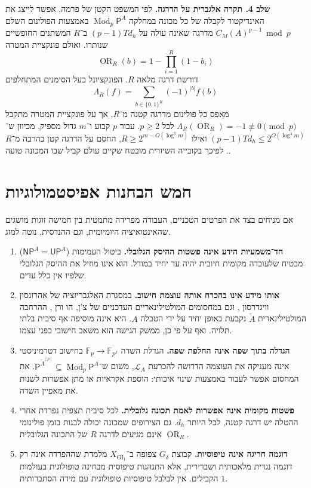 \documentclass[11pt,a4paper]{article}
\newcommand{\NP}{\mathsf{NP}}
\newcommand{\UP}{\mathsf{UP}}
\newcommand{\PP}{\mathsf P}
\newcommand{\GI}{\mathrm{GI}_1}
\newcommand{\FF}{\mathbb F}
\newcommand{\LA}{\mathcal{L}_A}
\newcommand{\MOD}{\operatorname{Mod}}
\newcommand{\OR}{\operatorname{OR}}
\begin{document}
\medskip
\noindent\textbf{שלב 4. תקרה אלגברית על הדרגה.}
לפי המשפט הקטן של פרמה, אפשר לייצג את האינדיקטור לקבלה של כל מכונה במחלקה $\MOD_p\PP^A$ באמצעות הפולינום השלם $C_M(A)^{p-1}\bmod p$ מדרגה שאינה עולה על $(p-1)T d_h$ ב־$R$ המשתנים החופשיים שנותרו. ואולם פונקציית המטרה
\[
\OR_R(b)=1-\prod_{i=1}^R(1-b_i)
\]
דורשת דרגה מלאה $R$. הפונקציונל בעל הסימנים המתחלפים
\[
\Lambda_R(f)=\sum_{b\in\{0,1\}^R}(-1)^{|b|}f(b)
\]
מאפס כל פולינום מדרגה קטנה מ־$R$, אך על פונקציית המטרה מתקבל $\Lambda_R(\OR_R)=-1\not\equiv0\pmod p$ לכל $p\ge2$. עבור $p$ קבוע ו־$m$ גדול מספיק, מכיוון ש־$(p-1)T d_h\le2^{O(\log^4m)}$ ואילו $R\ge2^{m-O(\log^5m)}$, החסם על הדרגה קטן בהרבה מ־$R$. לפיכך בקובייה השיורית מובטח שקיים עולם קביל שבו המכונה טועה.

\section{חמש הבחנות אפיסטמולוגיות}
אם מניחים בצד את הפרטים הטכניים, העבודה מפרידה מתמטית בין חמישה זוגות מושגים שהאינטואיציה היומיומית, וגם ההנדסית, נוטה למזג.

\begin{enumerate}
\item \textbf{חד־משמעיות הידע אינה פשטות ההיסק הגלובלי.} ביטול העמימות ($\NP^A=\UP^A$) מבטיח שלעובדה מקומית חיובית יהיה עד יחיד במודל. הוא אינו מוזיל את ההיסק הגלובלי שלפיו אין כלל עדים.
\item \textbf{אותו מידע אינו בהכרח אותה עוצמת חישוב.} במסגרת האלגבריזציה של אהרונסון וויגדרסון \cite{aw}, וגם במחסומים המולטילינאריים העדכניים של צ'ן, הו ורן \cite{chr}, ההרחבה המולטילינארית $\widetilde A$ נקבעת באופן יחיד על ידי הטבלה $A$. היא אינה מוסיפה אף סיבית בלתי תלויה. ואף על פי כן, ממשק הגישה הוא משאב חישובי בפני עצמו.
\item \textbf{הגדלה בתוך שפה אינה החלפת שפה.} הגדלת השדה $\FF_p\to\FF_{p^k}$ בחישוב דטרמיניסטי אינה מעניקה את העוצמה הדרושה להכרעת $\LA$, משום ש־$\PP^{\widetilde A^{[p]}}\subseteq\MOD_p\PP^A$. את המחסום אפשר לעבור באמצעות שינוי איכותי: הוספת אקראיות או מתן אפשרות לשנות את מאפיין השדה.
\item \textbf{פשטות מקומית אינה אפשרות לאמת תכונה גלובלית.} לכל סיבית תצפית נפרדת אחרי ההטלה יש דרגה קטנה, לכל היותר $d_h$. גם הצירופים שמכונה יכולה לבנות בזמן פולינומי אינם מגיעים לדרגה $R$ של התכונה הגלובלית $\OR_R$.
\item \textbf{דוגמה חריגה אינה טיפוסיות.} קבוצת $G_\delta$ צפופה ב־$X_{\GI}$ מלמדת שההפרדה אינה רק דוגמה נגדית מלאכותית ושברירית, אלא התנהגות טיפוסית מבחינה טופולוגית בעולמות הקבילים. אין לבלבל טיפוסיות טופולוגית עם מידה הסתברותית $1$.
\end{enumerate}
\end{document}
